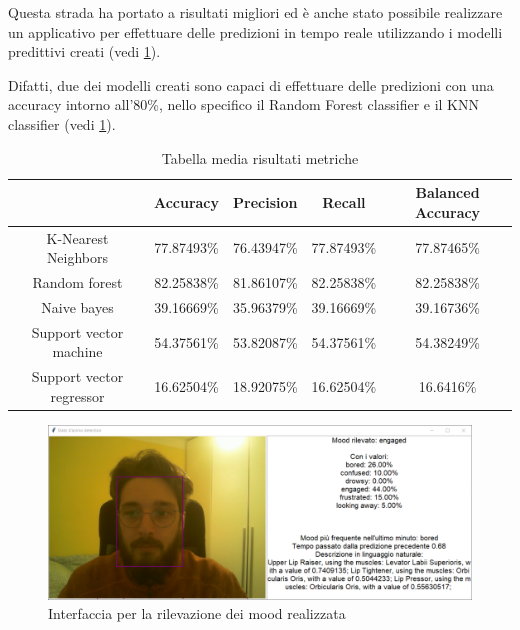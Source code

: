 Questa strada 
ha portato a risultati migliori ed è anche stato possibile realizzare un applicativo per effettuare delle predizioni in tempo reale utilizzando i modelli predittivi creati (vedi \ref{fig:image35}). 

Difatti, due dei modelli creati sono capaci di effettuare 
delle predizioni con una accuracy intorno all’80\%, nello specifico il Random Forest 
classifier e il KNN classifier (vedi \ref{tab:7}).
\begin{table}
    \small %
    \caption{Tabella media risultati metriche}
    \label{tab:7}
    \begin{tabular}{ |c||c|c|c|c| } 
         \hline
          & Accuracy & Precision & Recall & Balanced Accuracy\\ 
         \hline\hline
         K-Nearest Neighbors& 77.87493\% & 76.43947\% & 77.87493\% & 77.87465\%\\
         \hline
         Random forest & 82.25838\% & 81.86107\% & 82.25838\% & 82.25838\%\\
         \hline
         Naive bayes& 39.16669\% & 35.96379\% & 39.16669\% & 39.16736\%\\
         \hline
         Support vector machine& 54.37561\% & 53.82087\% & 54.37561\% & 54.38249\%\\
         \hline
         Support vector regressor& 16.62504\% & 18.92075\% & 16.62504\% & 16.6416\%\\
         \hline
    \end{tabular}
\end{table}
\begin{figure}
    \begin{center}    
        \includegraphics[width=0.9\linewidth]{images/image52.png}
        \caption{Interfaccia per la rilevazione dei mood realizzata}
        \label{fig:image35}
    \end{center}
\end{figure}
